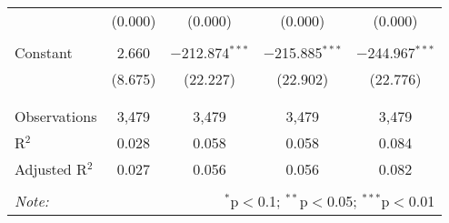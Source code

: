 \begin{table}[!htbp]
\begin{tabular}{@{\extracolsep{-5pt}}lcccc}
  & (0.000) & (0.000) & (0.000) & (0.000) \\ 
  & & & & \\ 
 Constant & 2.660 & $-$212.874$^{***}$ & $-$215.885$^{***}$ & $-$244.967$^{***}$ \\ 
  & (8.675) & (22.227) & (22.902) & (22.776) \\ 
  & & & & \\ 
\hline \\[-1.8ex] 
Observations & 3,479 & 3,479 & 3,479 & 3,479 \\ 
R$^{2}$ & 0.028 & 0.058 & 0.058 & 0.084 \\ 
Adjusted R$^{2}$ & 0.027 & 0.056 & 0.056 & 0.082 \\ 
\hline 
\hline \\[-1.8ex] 
\textit{Note:}  & \multicolumn{4}{r}{$^{*}$p$<$0.1; $^{**}$p$<$0.05; $^{***}$p$<$0.01} \\ 
\end{tabular} 
\end{table} 
